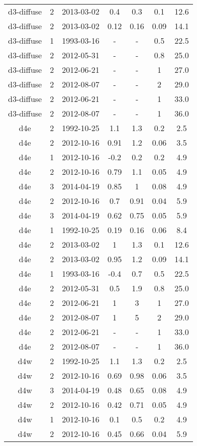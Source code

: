 \begin{table*}[htp]
\begin{tabular}{ccccccc}
d3-diffuse & 2 & 2013-03-02 & 0.4 & 0.3 & 0.1 & 12.6 \\
d3-diffuse & 2 & 2013-03-02 & 0.12 & 0.16 & 0.09 & 14.1 \\
d3-diffuse & 1 & 1993-03-16 & - & - & 0.5 & 22.5 \\
d3-diffuse & 2 & 2012-05-31 & - & - & 0.8 & 25.0 \\
d3-diffuse & 2 & 2012-06-21 & - & - & 1 & 27.0 \\
d3-diffuse & 2 & 2012-08-07 & - & - & 2 & 29.0 \\
d3-diffuse & 2 & 2012-06-21 & - & - & 1 & 33.0 \\
d3-diffuse & 2 & 2012-08-07 & - & - & 1 & 36.0 \\
d4e & 2 & 1992-10-25 & 1.1 & 1.3 & 0.2 & 2.5 \\
d4e & 2 & 2012-10-16 & 0.91 & 1.2 & 0.06 & 3.5 \\
d4e & 1 & 2012-10-16 & -0.2 & 0.2 & 0.2 & 4.9 \\
d4e & 2 & 2012-10-16 & 0.79 & 1.1 & 0.05 & 4.9 \\
d4e & 3 & 2014-04-19 & 0.85 & 1 & 0.08 & 4.9 \\
d4e & 2 & 2012-10-16 & 0.7 & 0.91 & 0.04 & 5.9 \\
d4e & 3 & 2014-04-19 & 0.62 & 0.75 & 0.05 & 5.9 \\
d4e & 1 & 1992-10-25 & 0.19 & 0.16 & 0.06 & 8.4 \\
d4e & 2 & 2013-03-02 & 1 & 1.3 & 0.1 & 12.6 \\
d4e & 2 & 2013-03-02 & 0.95 & 1.2 & 0.09 & 14.1 \\
d4e & 1 & 1993-03-16 & -0.4 & 0.7 & 0.5 & 22.5 \\
d4e & 2 & 2012-05-31 & 0.5 & 1.9 & 0.8 & 25.0 \\
d4e & 2 & 2012-06-21 & 1 & 3 & 1 & 27.0 \\
d4e & 2 & 2012-08-07 & 1 & 5 & 2 & 29.0 \\
d4e & 2 & 2012-06-21 & - & - & 1 & 33.0 \\
d4e & 2 & 2012-08-07 & - & - & 1 & 36.0 \\
d4w & 2 & 1992-10-25 & 1.1 & 1.3 & 0.2 & 2.5 \\
d4w & 2 & 2012-10-16 & 0.69 & 0.98 & 0.06 & 3.5 \\
d4w & 3 & 2014-04-19 & 0.48 & 0.65 & 0.08 & 4.9 \\
d4w & 2 & 2012-10-16 & 0.42 & 0.71 & 0.05 & 4.9 \\
d4w & 1 & 2012-10-16 & 0.1 & 0.5 & 0.2 & 4.9 \\
d4w & 2 & 2012-10-16 & 0.45 & 0.66 & 0.04 & 5.9 \\

\end{tabular}
\end{table*}
